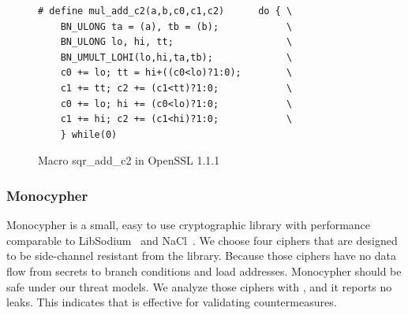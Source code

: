 \begin{figure}
    \centering
    \begin{lstlisting}[xleftmargin=.02\textwidth,xrightmargin=.01\textwidth]
# define mul_add_c2(a,b,c0,c1,c2)      do { \
    BN_ULONG ta = (a), tb = (b);            \
    BN_ULONG lo, hi, tt;                    \
    BN_UMULT_LOHI(lo,hi,ta,tb);             \
    c0 += lo; tt = hi+((c0<lo)?1:0);        \
    c1 += tt; c2 += (c1<tt)?1:0;            \
    c0 += lo; hi += (c0<lo)?1:0;            \
    c1 += hi; c2 += (c1<hi)?1:0;            \
    } while(0)
\end{lstlisting}
    \vspace*{-6pt}
    \caption{Macro \textsf{sqr\_add\_c2} in OpenSSL 1.1.1}
    \label{fig:new_sqr2}
    \vspace*{-10pt}
\end{figure}


\subsubsection{Monocypher}\label{eval:mono}
Monocypher is a small, easy to use cryptographic library with
performance comparable to LibSodium~\cite{libsodium} and NaCl~\cite{bernstein2012security}. 
We choose four ciphers that are 
designed to be side-channel resistant from the library.
Because those ciphers have no 
data flow from secrets to branch conditions and load addresses.
Monocypher should be safe under our threat models. 
We analyze those ciphers with \tool{}, and it reports no leaks.
This indicates that \tool{} is effective for validating countermeasures.
